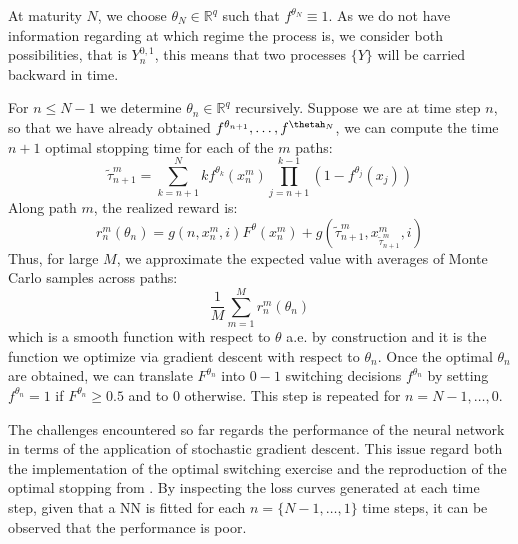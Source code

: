 \documentclass{article}
\begin{document}
At maturity $N$, we choose $\theta_N \in \mathbb{R}^q$ such that $f^{\theta_N}\equiv 1$. As we do not have information regarding at which regime the process is, we consider both possibilities, that is $Y_n^{0,1}$, this means that two processes $\{Y\}$ will be carried backward in time.

For $n \leq N-1$ we determine $\theta_n \in \mathbb{R}^q$ recursively. Suppose we are at time step $n$, so that we have already obtained $f^{\theta_{n +1}}, \ldots, f^{\thetah_N} $, we can compute the time $n+1$ optimal stopping time for each of the $m$ paths:
\begin{equation}
    \tilde{\tau}_{n+1}^m = \sum_{k=n+1}^N k f^{\theta_k}(x_n^m) \prod_{j=n+1}^{k-1}(1-f^{\theta_j}(x_j))
\end{equation}
Along path $m$, the realized reward is:
\begin{equation}
    r^m_n(\theta_n) = g(n, x_n^m, i)F^{\theta}(x_n^m)+g(\tilde{\tau}_{n+1}^m, x^m_{\tilde{\tau}^m_{n+1}}, i)
\end{equation}
Thus, for large $M$, we approximate the expected value with averages of Monte Carlo samples across paths:
\begin{equation}
    \frac{1}{M}\sum_{m=1}^M r_n^m(\theta_n)
\end{equation}
which is a smooth function with respect to $\theta$ a.e. by construction and it is the function we optimize via gradient descent with respect to $\theta_n$. Once the optimal $\theta_n$ are obtained, we can translate $F^{\theta_n}$ into $0-1$ switching decisions $f^{\theta_n}$ by setting $f^{\theta_n}=1$ if $F^{\theta_n} \geq 0.5$ and to $0$ otherwise. This step is repeated for $n=N-1, \ldots, 0$.

\smallskip

The challenges encountered so far regards the performance of the neural network in terms of the application of stochastic gradient descent. This issue regard both the implementation of the optimal switching exercise and the reproduction of the optimal stopping from \cite{becker2019deep}. By inspecting the loss curves generated at each time step, given that a NN is fitted for each $n=\{N-1, \ldots, 1\}$ time steps, it can be observed that the performance is poor. 
\end{document}
